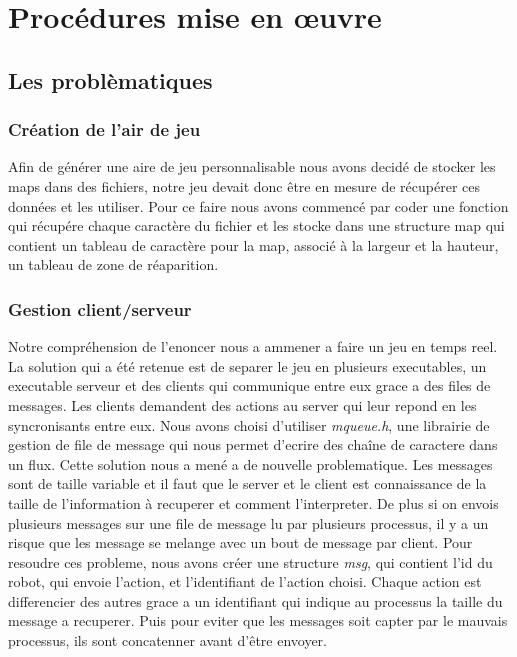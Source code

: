 \documentclass[a4paper, 11pt]{article}
\title{\myfont {Robots programmables}}
\author{\huge {COTREZ Léo}\and \huge {ORNIACKI Thomas}\and \\Université Paris-VIII, Saint-Denis, France\and \\Licence 2 Informatique}
\date{Premier Semestre 2018}
\begin{document}
\maketitle

\newpage
\tableofcontents

\newpage
\section{Procédures mise en \oe uvre}
\subsection{Les problèmatiques}
\subsubsection{Création de l'air de jeu}
Afin de générer une aire de jeu personnalisable nous avons decidé de stocker les maps dans des fichiers, notre jeu devait donc être en mesure de récupérer ces données et les utiliser. Pour ce faire nous avons commencé par coder une fonction qui récupére chaque caractère du fichier et les stocke dans une structure map qui contient un tableau de caractère pour la map, associé à la largeur et la hauteur, un tableau de zone de réaparition.\\
\subsubsection{Gestion client/serveur}
Notre compréhension de l'enoncer nous a ammener a faire un jeu en temps reel. La solution qui a été retenue est de separer le jeu en plusieurs executables, un executable serveur et des clients qui communique entre eux grace a des files de messages. Les clients demandent des actions au server qui leur repond en les syncronisants entre eux. Nous avons choisi d'utiliser \emph{mqueue.h}, une librairie de gestion de file de message qui nous permet d'ecrire des chaîne de caractere dans un flux. Cette solution nous a mené a de nouvelle problematique.
Les messages sont de taille variable et il faut que le server et le client est connaissance de la taille de l'information à recuperer et comment l'interpreter. De plus si on envois plusieurs messages sur une file de message lu par plusieurs processus, il y a un risque que les message se melange avec un bout de message par client.
Pour resoudre ces probleme, nous avons créer une structure \emph{msg}, qui contient l'id du robot, qui envoie l'action, et l'identifiant de l'action choisi. Chaque action est differencier des autres grace a un identifiant qui indique au processus la taille du message a recuperer. Puis pour eviter que les messages soit capter par le mauvais processus, ils sont concatenner avant d'être envoyer.
\end{document}
